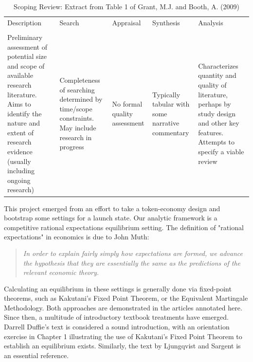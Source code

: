 \documentclass[11pt]{article}
\begin{document}
\begin{table}[!h]
\caption{Scoping Review: Extract from Table 1 of Grant, M.J. and Booth, A. (2009)} %
\small
\centering %
\begin{tabular}{p{}p{}p{}p{}p{}} %
\hline\hline %
Description & Search & Appraisal & Synthesis & Analysis \\ [0.5ex]
\\ [0.5ex]
\hline %

Preliminary assessment of potential size and scope of available research literature. Aims to identify the nature and extent of research evidence (usually including ongoing research)	
& Completeness of searching determined by time/scope constraints. May include research in progress 
& No formal quality assessment 
& Typically tabular with some narrative commentary
& Characterizes quantity and quality of literature, perhaps by study design and other key features. Attempts to specify a viable review\\[1.5ex]
\hline %

\end{tabular}
\label{tbl:sr}
\end{table}

This project emerged from an effort to take a token-economy design and bootstrap some settings for a launch state. Our analytic framework is a competitive rational expectations equilibrium setting.  The definition of "rational expectations" in economics is due to John Muth\autocite{muth61}:

\begin{quote}
    \textit{In order to explain fairly simply how expectations are formed, we advance the hypothesis that they are essentially the same as the predictions of the relevant economic theory.}
\end{quote}

Calculating an equilibrium in these settings is generally done via fixed-point theorems, such as Kakutani's Fixed Point Theorem\autocite{kakutani41}, or the Equivalent Martingale Methodology. Both approaches are demonstrated in the articles annotated here.  Since then, a multitude of introductory textbook treatments have emerged. Darrell Duffie's text\autocite{duffie01} is considered a sound introduction, with an orientation exercise in Chapter 1 illustrating the use of Kakutani's Fixed Point Theorem to establish an equilibrium exists. Similarly, the text\autocite{ljungqvist18} by Ljungqvist and Sargent is an essential reference.
\end{document}

